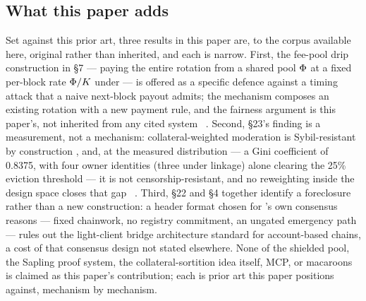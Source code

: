 \subsection{What this paper adds}

Set against this prior art, three results in this paper are, to the corpus available here, original
rather than inherited, and each is narrow. First, the fee-pool drip construction in §7 — paying the
entire \PoN rotation from a shared pool $\Phi$ at a fixed per-block rate $\Phi/K$ under \PNR — is
offered as a specific defence against a timing attack that a naive next-block payout admits; the
mechanism composes an existing rotation with a new payment rule, and the fairness argument is this
paper's, not inherited from any cited system \planned\ . Second, §23's finding is a
measurement, not a mechanism: collateral-weighted moderation is Sybil-resistant by construction
\citep{douceur2002sybil}, and, at the measured distribution — a Gini coefficient of 0.8375, with four
owner identities (three under linkage) alone clearing the 25\% eviction threshold — it is not censorship-resistant,
and no reweighting inside the design space closes that gap \shipped\
. Third, §22 and §4 together identify a
foreclosure rather than a new construction: a header format chosen for \PoN's own consensus reasons —
fixed chainwork, no registry commitment, an ungated emergency path — rules out the light-client bridge
architecture standard for account-based chains, a cost of that consensus design not stated elsewhere.
None of the shielded pool, the Sapling proof system, the collateral-sortition idea itself, MCP, or
macaroons is claimed as this paper's contribution; each is prior art this paper positions \Flux
against, mechanism by mechanism.

\FloatBarrier
